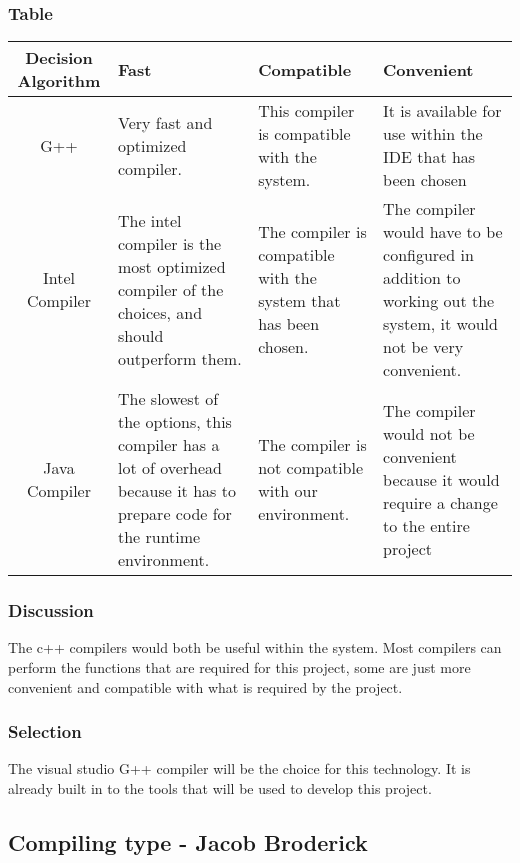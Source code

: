\subsubsection{Table}
\begin{center}
	\begin{tabular}{ ||C|M|M|M|| } 
		\hline
		Decision Algorithm & Fast & Compatible & Convenient \\
		\hline
		G++ & Very fast and optimized compiler. & This compiler is compatible with the system. & It is available for use within the IDE that has been chosen \\ 
		\hline
		Intel Compiler & The intel compiler is the most optimized compiler of the choices, and should outperform them. & The compiler is compatible with the system that has been chosen. & The compiler would have to be configured in addition to working out the system, it would not be very convenient. \\ 
		\hline
		Java Compiler & The slowest of the options, this compiler has a lot of overhead because it has to prepare code for the runtime environment. & The compiler is not compatible with our environment. & The compiler would not be convenient because it would require a change to the entire project \\ 
		\hline
	\end{tabular}
\end{center}
\subsubsection{Discussion}
The c++ compilers would both be useful within the system. Most compilers can perform the functions that are required for this project, some are just more convenient and compatible with what is required by the project.
\subsubsection{Selection}
The visual studio G++ compiler will be the choice for this technology. It is already built in to the tools that will be used to develop this project.

\subsection{Compiling type - Jacob Broderick}

